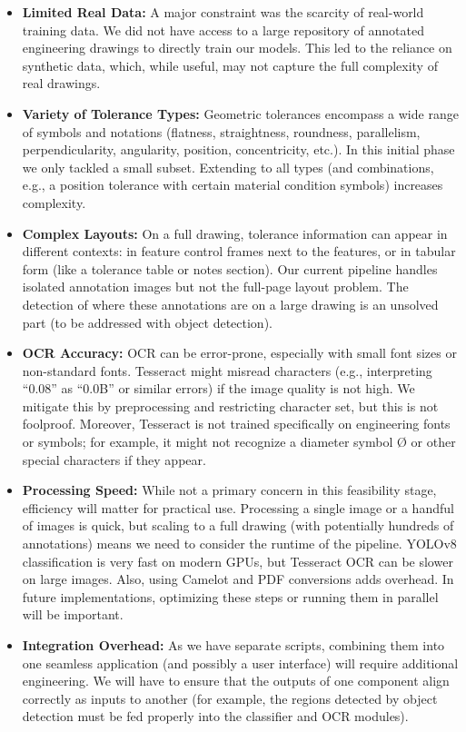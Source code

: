 \documentclass[11pt,a4paper]{article}
\begin{document}
\begin{itemize}
  \item \textbf{Limited Real Data:} A major constraint was the scarcity of real-world training data. We did not have access to a large repository of annotated engineering drawings to directly train our models. This led to the reliance on synthetic data, which, while useful, may not capture the full complexity of real drawings.
  \item \textbf{Variety of Tolerance Types:} Geometric tolerances encompass a wide range of symbols and notations (flatness, straightness, roundness, parallelism, perpendicularity, angularity, position, concentricity, etc.). In this initial phase we only tackled a small subset. Extending to all types (and combinations, e.g., a position tolerance with certain material condition symbols) increases complexity.
  \item \textbf{Complex Layouts:} On a full drawing, tolerance information can appear in different contexts: in feature control frames next to the features, or in tabular form (like a tolerance table or notes section). Our current pipeline handles isolated annotation images but not the full-page layout problem. The detection of where these annotations are on a large drawing is an unsolved part (to be addressed with object detection).
  \item \textbf{OCR Accuracy:} OCR can be error-prone, especially with small font sizes or non-standard fonts. Tesseract might misread characters (e.g., interpreting “0.08” as “0.0B” or similar errors) if the image quality is not high. We mitigate this by preprocessing and restricting character set, but this is not foolproof. Moreover, Tesseract is not trained specifically on engineering fonts or symbols; for example, it might not recognize a diameter symbol Ø or other special characters if they appear.
  \item \textbf{Processing Speed:} While not a primary concern in this feasibility stage, efficiency will matter for practical use. Processing a single image or a handful of images is quick, but scaling to a full drawing (with potentially hundreds of annotations) means we need to consider the runtime of the pipeline. YOLOv8 classification is very fast on modern GPUs, but Tesseract OCR can be slower on large images. Also, using Camelot and PDF conversions adds overhead. In future implementations, optimizing these steps or running them in parallel will be important.
  \item \textbf{Integration Overhead:} As we have separate scripts, combining them into one seamless application (and possibly a user interface) will require additional engineering. We will have to ensure that the outputs of one component align correctly as inputs to another (for example, the regions detected by object detection must be fed properly into the classifier and OCR modules).

\end{itemize}
\end{document}
